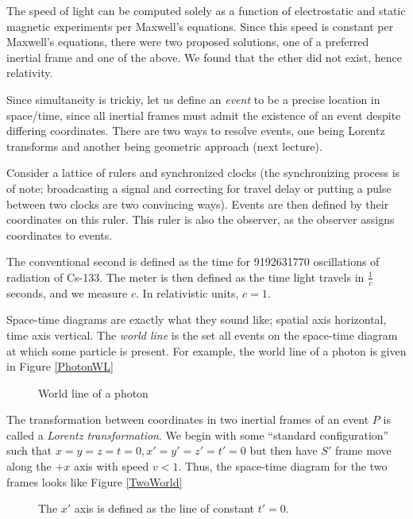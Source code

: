 \documentclass[10pt]{report}
\begin{document}
The speed of light can be computed solely as a function of electrostatic and static magnetic experiments per Maxwell's equations. Since this speed is constant per Maxwell's equations, there were two proposed solutions, one of a preferred inertial frame and one of the above. We found that the ether did not exist, hence relativity.

Since simultaneity is trickiy, let us define an \emph{event} to be a precise location in space/time, since all inertial frames must admit the existence of an event despite differing coordinates. There are two ways to resolve events, one being Lorentz transforms and another being geometric approach (next lecture).

Consider a lattice of rulers and synchronized clocks (the synchronizing process is of note; broadcasting a signal and correcting for travel delay or putting a pulse between two clocks are two convincing ways). Events are then defined by their coordinates on this ruler. This ruler is also the observer, as the observer assigns coordinates to events. 

The conventional second is defined as the time for 9192631770 oscillations of radiation of Cs-133. The meter is then defined as the time light travels in $\frac{1}{c}$ seconds, and we measure $c$. In relativistic units, $c = 1$.

Space-time diagrams are exactly what they sound like; spatial axis horizontal, time axis vertical. The \emph{world line} is the set all events on the space-time diagram at which some particle is present. For example, the world line of a photon is given in Figure \eqref{PhotonWL}
\begin{figure}[!h]
    \centering
    \caption{World line of a photon}
    \label{PhotonWL}
\end{figure}

The transformation between coordinates in two inertial frames of an event $P$ is called a \emph{Lorentz transformation}. We begin with some ``standard configuration'' such that $x=y=z=t=0, x' = y' = z' = t' = 0$ but then have $S'$ frame move along the $+x$ axis with speed $v < 1$. Thus, the space-time diagram for the two frames looks like Figure \eqref{TwoWorld}
\begin{figure}[!h]
    \centering
    \caption{The $x'$ axis is defined as the line of constant $t' = 0$.}
    \label{TwoWorld}
\end{figure}
\end{document}
